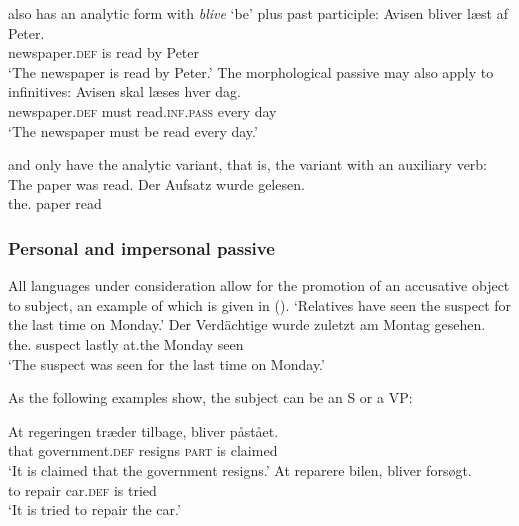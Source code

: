 \noindent
{} also has an analytic form with \emph{blive} `be' plus past participle: 
\ea
\gll Avisen                 bliver læst af Peter.\\
     newspaper.\textsc{def} is     read by Peter\\\danish
\glt `The newspaper is read by Peter.'
\z
The morphological passive may also apply to infinitives:
\ea
\gll Avisen skal læses hver dag.\\
     newspaper.\textsc{def} must read.\textsc{inf}.\textsc{pass} every day\\\danish
\glt `The newspaper must be read every day.'
\z

\noindent
{} and  only have the analytic variant, that is, the variant with an
auxiliary verb:
\eal
\ex The paper was read.
\ex 
\gll Der        Aufsatz wurde  gelesen.\\
     the.\NOM{} paper   \AUX{} read\\\german
\zl    





\subsubsection{Personal and impersonal passive}
\label{sec-impersonal-passive-phen}

All languages under consideration allow for the promotion of an accusative object to subject, an
example of which is given in ().
\eal
\ex
{}
\glt `Relatives have seen the suspect for the last time on Monday.'
\ex 
\gll Der        Verdächtige wurde  zuletzt am Montag gesehen.\\
     the.\NOM{} suspect     \AUX{} lastly at.the Monday seen\\
\glt `The suspect was seen for the last time on Monday.'
\zl

\noindent
As the following examples show, the subject can be an S or a VP:

\eal
\ex
\gll At regeringen træder tilbage, bliver påstået.\\
     that government.\textsc{def} resigns \textsc{part} is claimed\\\danish
\glt `It is claimed that the government resigns.'
\ex
\gll At reparere bilen, bliver forsøgt.\\
     to repair car.\textsc{def} is tried\\
\glt `It is tried to repair the car.'
\zl

